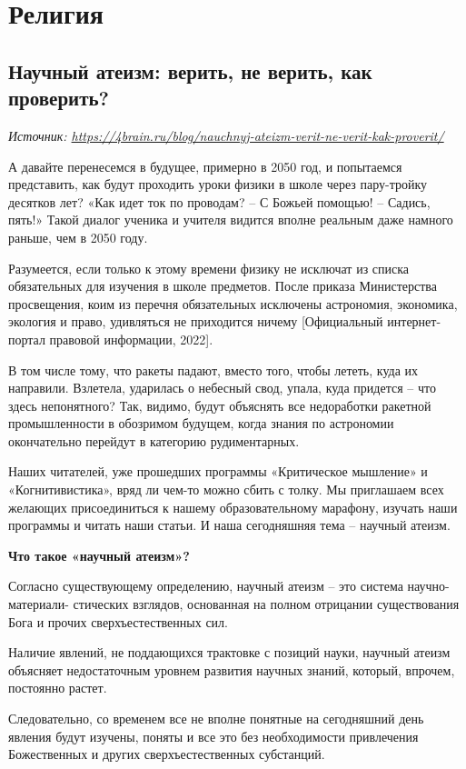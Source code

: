 \chapter{Религия}

\section{Научный атеизм: верить, не верить, как проверить?}

\textit{Источник: \url{https://4brain.ru/blog/nauchnyj-ateizm-verit-ne-verit-kak-proverit/}}

А давайте перенесемся в будущее, примерно в 2050 год, и попытаемся представить, как будут проходить уроки физики в школе через пару-тройку десятков лет? «Как идет ток по проводам? – С Божьей помощью! – Садись, пять!» Такой диалог ученика и учителя видится вполне реальным даже намного раньше, чем в 2050 году.

Разумеется, если только к этому времени физику не исключат из списка обязательных для изучения в школе предметов. После приказа Министерства просвещения, коим из перечня обязательных исключены астрономия, экономика, экология и право, удивляться не приходится ничему [Официальный интернет-портал правовой информации, 2022].

В том числе тому, что ракеты падают, вместо того, чтобы лететь, куда их направили. Взлетела, ударилась о небесный свод, упала, куда придется – что здесь непонятного? Так, видимо, будут объяснять все недоработки ракетной промышленности в обозримом будущем, когда знания по астрономии окончательно перейдут в категорию рудиментарных.

Наших читателей, уже прошедших программы «Критическое мышление» и «Когнитивистика», вряд ли чем-то можно сбить с толку. Мы приглашаем всех желающих присоединиться к нашему образовательному марафону, изучать наши программы и читать наши статьи. И наша сегодняшняя тема – научный атеизм.

\textbf{Что такое «научный атеизм»?}

Согласно существующему определению, научный атеизм – это система научно-материали- стических взглядов, основанная на полном отрицании существования Бога и прочих сверхъестественных сил.

Наличие явлений, не поддающихся трактовке с позиций науки, научный атеизм объясняет недостаточным уровнем развития научных знаний, который, впрочем, постоянно растет.

Следовательно, со временем все не вполне понятные на сегодняшний день явления будут изучены, поняты и все это без необходимости привлечения Божественных и других сверхъестественных субстанций.


